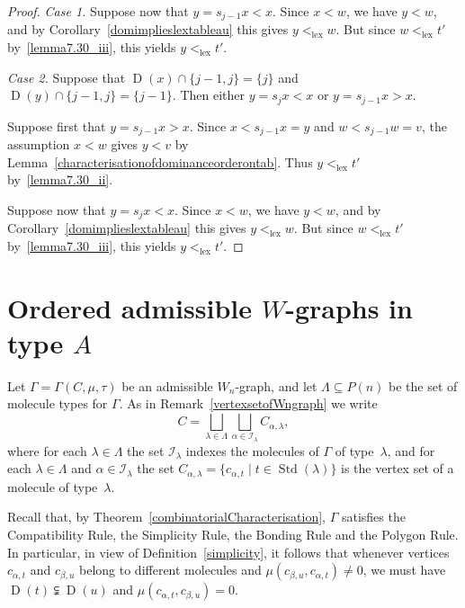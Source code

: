 \documentclass[ALCO,ThmDefs,Unicode,epreuves]{cedram}
\newenvironment{Case}[1]{\smallskip\noindent\emph{Case #1}\endgraf
 \nobreak\noindent\ignorespaces}{\endgraf\smallskip}
\DeclareMathOperator{\lex}{lex}
\DeclareMathOperator{\STD}{Std}
\DeclareMathOperator{\D}{D}
\begin{document}
\begin{proof}
\begin{Case}{1.}
Suppose now that $y=s_{j-1}x<x$. Since $x<w$, we have $y<w$,
and by Corollary~\ref{domimplieslextableau} this gives $y<_{\lex}w$.
But since $w<_{\lex}t'$ by~\ref{lemma7.30_iii}, this yields $y<_{\lex}t'$.
\end{Case}

\begin{Case}{2.} Suppose that $\D(x)\cap\{j-1,j\}=\{j\}$ and $\D(y)\cap\{j-1,j\}=\{j-1\}$.
Then either $y=s_jx<x$ or $y=s_{j-1}x>x$.

Suppose first that $y=s_{j-1}x>x$. Since $x<s_{j-1}x=y$ and $w<s_{j-1}w=v$, the assumption
$x<w$ gives $y<v$ by Lemma~\ref{characterisationofdominanceorderontab}. Thus
$y<_{\lex}t'$ by~\ref{lemma7.30_ii}.

Suppose now that $y=s_jx<x$. Since $x<w$, we have $y<w$, and by
Corollary~\ref{domimplieslextableau} this gives $y<_{\lex}w$. But since
$w<_{\lex}t'$ by~\ref{lemma7.30_iii}, this yields $y<_{\lex}t'$.\qedhere
\end{Case}
\end{proof}

\section{Ordered admissible \texorpdfstring{$W$}{W}-graphs in type \texorpdfstring{$A$}{A}}
\label{sec:8ex}

Let $\Gamma=\Gamma(C,\mu,\tau)$ be an admissible $W_n$-graph, and let
$\Lambda\subseteq P(n)$ be the set of molecule types for $\Gamma$. As in
Remark~\ref{vertexsetofWngraph} we write
\begin{equation*}
C=\bigsqcup_{\lambda\in\Lambda}\bigsqcup_{\alpha\in\mathcal{I}_{\lambda}}C_{\alpha,\lambda},
\end{equation*}
where for each $\lambda\in\Lambda$ the set $\mathcal{I}_{\lambda}$ indexes
the molecules of $\Gamma$ of type~$\lambda$, and for each $\lambda\in\Lambda$
and $\alpha\in\mathcal{I}_{\lambda}$ the set
$C_{\alpha,\lambda}=\{c_{\alpha,t}\mid t\in\STD(\lambda)\}$ is the vertex
set of a molecule of type~$\lambda$.

Recall that, by Theorem~\ref{combinatorialCharacterisation}, $\Gamma$ satisfies the
Compatibility Rule, the Simplicity Rule,
the Bonding Rule and the Polygon Rule.
In particular,
in view of Definition~\ref{simplicity}, it follows that whenever vertices $c_{\alpha,t}$
and $c_{\beta,u}$ belong to different molecules and
$\mu(c_{\beta,u},c_{\alpha,t})\neq 0$, we must have $\D(t)\subsetneqq\D(u)$ and
$\mu(c_{\alpha,t},c_{\beta,u})=0$.
\end{document}
